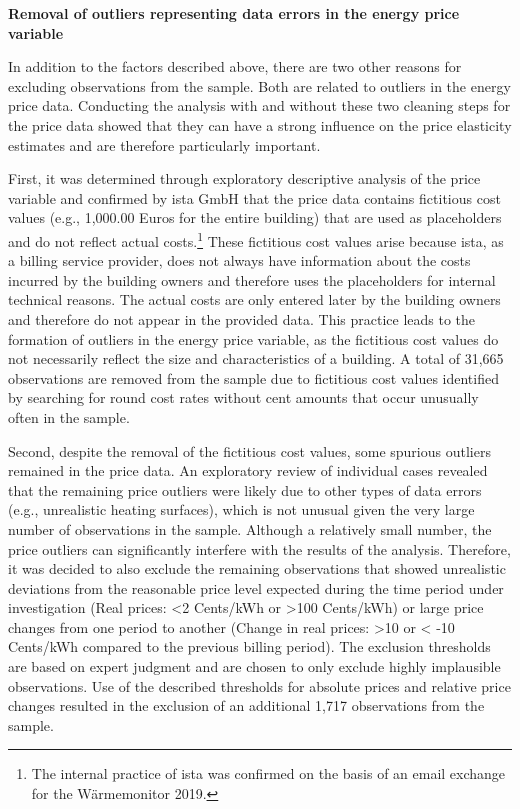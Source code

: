 \documentclass[12pt,twoside]{reedthesis}
\begin{document}
\textbf{Removal of outliers representing data errors in the energy price variable}

In addition to the factors described above, there are two other reasons for excluding observations from the sample. Both are related to outliers in the energy price data. Conducting the analysis with and without these two cleaning steps for the price data showed that they can have a strong influence on the price elasticity estimates and are therefore particularly important.

First, it was determined through exploratory descriptive analysis of the price variable and confirmed by ista GmbH that the price data contains fictitious cost values (e.g., 1,000.00 Euros for the entire building) that are used as placeholders and do not reflect actual costs.\footnote{The internal practice of ista was confirmed on the basis of an email exchange for the Wärmemonitor 2019.} These fictitious cost values arise because ista, as a billing service provider, does not always have information about the costs incurred by the building owners and therefore uses the placeholders for internal technical reasons. The actual costs are only entered later by the building owners and therefore do not appear in the provided data. This practice leads to the formation of outliers in the energy price variable, as the fictitious cost values do not necessarily reflect the size and characteristics of a building. A total of 31,665 observations are removed from the sample due to fictitious cost values identified by searching for round cost rates without cent amounts that occur unusually often in the sample.

Second, despite the removal of the fictitious cost values, some spurious outliers remained in the price data. An exploratory review of individual cases revealed that the remaining price outliers were likely due to other types of data errors (e.g., unrealistic heating surfaces), which is not unusual given the very large number of observations in the sample. Although a relatively small number, the price outliers can significantly interfere with the results of the analysis. Therefore, it was decided to also exclude the remaining observations that showed unrealistic deviations from the reasonable price level expected during the time period under investigation (Real prices: \textless2 Cents/kWh or \textgreater100 Cents/kWh) or large price changes from one period to another (Change in real prices: \textgreater10 or \textless{} -10 Cents/kWh compared to the previous billing period). The exclusion thresholds are based on expert judgment and are chosen to only exclude highly implausible observations. Use of the described thresholds for absolute prices and relative price changes resulted in the exclusion of an additional 1,717 observations from the sample.
\end{document}
